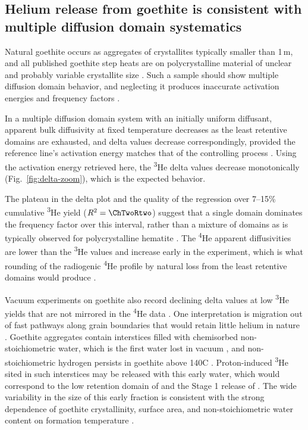\subsection{Helium release from goethite is consistent with multiple diffusion domain systematics}\label{sec:discussion-mdd}

Natural goethite occurs as aggregates of crystallites typically smaller than 1\,\textmu m, and all published goethite step heats are on polycrystalline material of unclear and probably variable crystallite size \citep{monteiro2017,farley2024}. Such a sample should show multiple diffusion domain behavior, and neglecting it produces inaccurate activation energies and frequency factors \citep{farley2018}.

In a multiple diffusion domain system with an initially uniform diffusant, apparent bulk diffusivity at fixed temperature decreases as the least retentive domains are exhausted, and delta values decrease correspondingly, provided the reference line's activation energy matches that of the controlling process \citep{lovera1991,farley2018}. Using the activation energy retrieved here, the \textsuperscript{3}He delta values decrease monotonically (Fig.~\ref{fig:delta-zoom}), which is the expected behavior.

The plateau in the delta plot and the quality of the regression over 7--15\% cumulative \textsuperscript{3}He yield ($R^{2} = \ChTwoRtwo$) suggest that a single domain dominates the frequency factor over this interval, rather than a mixture of domains as is typically observed for polycrystalline hematite \citep{farley2018}. The \textsuperscript{4}He apparent diffusivities are lower than the \textsuperscript{3}He values and increase early in the experiment, which is what rounding of the radiogenic \textsuperscript{4}He profile by natural loss from the least retentive domains would produce \citep{shuster2004,shustervasconcelos2005}.

Vacuum experiments on goethite also record declining delta values at low \textsuperscript{3}He yields that are not mirrored in the \textsuperscript{4}He data \citep{shustervasconcelos2005,farley2024}. One interpretation is migration out of fast pathways along grain boundaries that would retain little helium in nature \citep{shustervasconcelos2005}. Goethite aggregates contain interstices filled with chemisorbed non-stoichiometric water, which is the first water lost in vacuum \citep{naono1987}, and non-stoichiometric hydrogen persists in goethite above 140\textdegree C \citep{yapppoths1995}. Proton-induced \textsuperscript{3}He sited in such interstices may be released with this early water, which would correspond to the low retention domain of \citet{shustervasconcelos2005} and the Stage 1 release of \citet{farley2024}. The wide variability in the size of this early fraction is consistent with the strong dependence of goethite crystallinity, surface area, and non-stoichiometric water content on formation temperature \citep{schwertmann1985}.

